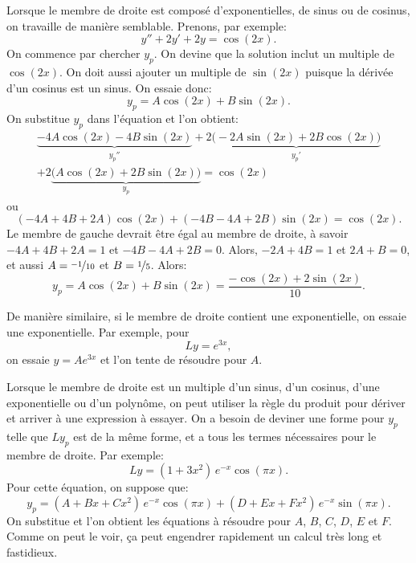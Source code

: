\medskip

Lorsque le membre de droite est composé d'exponentielles, de sinus ou de cosinus, on travaille de manière semblable. Prenons, par exemple: 
\begin{equation*}
	y''+2y'+2y = \cos (2x) .
\end{equation*}
On commence par chercher $y_p$.  On devine que la solution inclut un multiple de  $\cos(2x)$.
On doit aussi ajouter un multiple de $\sin (2x)$ puisque la dérivée d'un cosinus est un sinus. On essaie donc: 
\begin{equation*}
	y_p = A \cos (2x) + B \sin (2x) .
\end{equation*}
On substitue  $y_p$ dans l'équation et l'on obtient: 
\begin{multline*}
	\underbrace{-4 A \cos (2x) - 4 B \sin (2x)}_{y_p''}
		+2 \underbrace{\bigl(-2A \sin (2x) + 2B \cos (2x)\bigr)}_{y_p'}	\\
		+2 \underbrace{\bigl(A \cos (2x) + 2B \sin (2x)\bigr)}_{y_p}
	= \cos (2x) 
\end{multline*}
ou
\begin{equation*}
	(-4A+4B+2A) \cos(2x) +	(-4B-4A+2B) \sin(2x) 	= \cos(2x) .
\end{equation*}
Le membre de gauche devrait être égal au membre de droite, à savoir 
$-4A + 4B + 2A = 1$ et $-4B - 4A + 2B = 0$.  
Alors, $-2A+4B =1$ et $2A+B=0$, et aussi   $A=\nicefrac{-1}{10}$ et $B=\nicefrac{1}{5}$.  
Alors: 
\begin{equation*}
y_p = A \cos (2x) + B \sin (2x) = \frac{-\cos (2x) + 2 \sin (2x)}{10} .
\end{equation*}

De manière similaire, si le membre de droite contient une exponentielle, on essaie une exponentielle. Par exemple, pour 
\begin{equation*}
Ly = e^{3x},
\end{equation*}
on essaie $y = A e^{3x}$ et l'on tente de résoudre pour $A$.

\medskip

Lorsque le membre de droite est un multiple d'un sinus, d'un cosinus, d'une exponentielle ou d'un polynôme, on peut utiliser la règle du produit pour dériver et arriver à une expression à essayer. On a besoin de deviner une forme pour $y_p$ telle que $Ly_p$ est de la même forme, et a tous les termes nécessaires pour le membre de droite. Par exemple: 
\begin{equation*}
	Ly = (1+3x^2)\,e^{-x}\cos (\pi x) .
\end{equation*}
Pour cette équation, on suppose que: 
\begin{equation*}
	y_p = (A + Bx + Cx^2)\,e^{-x} \cos (\pi x) + (D + Ex + Fx^2)\,e^{-x} \sin (\pi x) .
\end{equation*}
On substitue et l'on obtient les équations à résoudre pour 
$A$, $B$, $C$, $D$, $E$ et $F$.
Comme on peut le voir, ça peut engendrer rapidement un calcul très long et fastidieux.  

